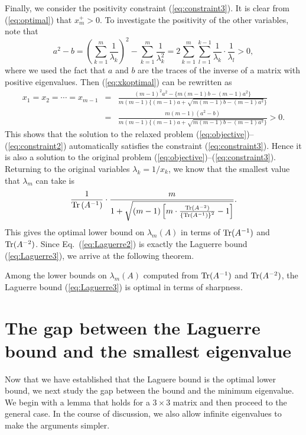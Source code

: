 \documentclass{amsart}
\begin{document}
Finally, we consider the positivity constraint (\ref{eq:constraint3}). It is clear from (\ref{eq:optimal}) that $x_m^+>0$. To investigate the positivity of the other variables, note that
\begin{equation}
a^2-b = \left(\sum_{k=1}^m\frac{1}{\lambda_k}\right)^2-\sum_{k=1}^m\frac{1}{\lambda_k^2} = 2\sum_{k=1}^m \sum_{l=1}^{k-1} \frac{1}{\lambda_k}\cdot\frac{1}{\lambda_l}>0,
\label{eq:alphaupper}
\end{equation}
where we used the fact that $a$ and $b$ are the traces of the inverse of a matrix with positive eigenvalues. Then (\ref{eq:xkoptimal}) can be rewritten as
\begin{eqnarray}
x_1 = x_2 = \cdots = x_{m-1} 
&=& \frac{(m-1)^2a^2-\{m(m-1)b-(m-1)a^2\}}{m(m-1)\{(m-1)a+\sqrt{m(m-1)b-(m-1)a^2}\}} \nonumber \\
&=& \frac{m(m-1)(a^2-b)}{m(m-1)\{ (m-1)a+\sqrt{m(m-1)b-(m-1)a^2}\}}>0.
\end{eqnarray}
This shows that the solution to the relaxed problem (\ref{eq:objective})--(\ref{eq:constraint2}) automatically satisfies the constraint (\ref{eq:constraint3}). Hence it is also a solution to the original problem (\ref{eq:objective})--(\ref{eq:constraint3}). Returning to the original variables $\lambda_k=1/x_k$, we know that the smallest value that $\lambda_m$ can take is
\begin{equation}
\frac{1}{{\rm Tr}\left(A^{-1}\right)}\cdot\frac{m}{1+\sqrt{(m-1)\left[m\cdot\frac{{\rm Tr}\left(A^{-2}\right)}{\left\{{\rm Tr}\left(A^{-1}\right)\right\}^2}-1\right]}}.
\label{eq:Laguerre2}
\end{equation}
This gives the optimal lower bound on $\lambda_m(A)$ in terms of ${\rm Tr}(A^{-1})$ and ${\rm Tr}(A^{-2})$. Since Eq.~(\ref{eq:Laguerre2}) is exactly the Laguerre bound (\ref{eq:Laguerre3}), we arrive at the following theorem.
\begin{The}
\label{T1}
Among the lower bounds on $\lambda_m(A)$ computed from ${\rm Tr}(A^{-1})$ and ${\rm Tr}(A^{-2})$, the Laguerre bound (\ref{eq:Laguerre3}) is optimal in terms of sharpness.
\end{The}



\section{The gap between the Laguerre bound and the smallest eigenvalue}
Now that we have established that the Laguere bound is the optimal lower bound, we next study the gap between the bound and the minimum eigenvalue. We begin with a lemma that holds for a $3\times 3$ matrix and then proceed to the general case. In the course of discussion, we also allow infinite eigenvalues to make the arguments simpler.
\end{document}
